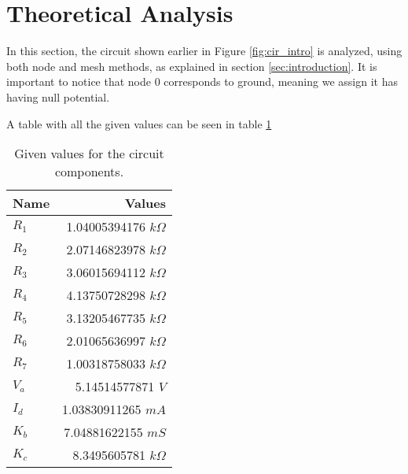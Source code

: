 \section{Theoretical Analysis}
\label{sec:analysis}

In this section, the circuit shown earlier in Figure \ref{fig:cir_intro} is analyzed, using both node and mesh methods, as explained in section \ref{sec:introduction}. It is important to notice that node 0 corresponds to ground, meaning we assign it has having null potential.
\par
A table with all the given values can be seen in table \ref{tab:values}

\begin{table}[H]
  \centering
\begin{tabular}{|l|r|}
\hline
{\bf Name} & {\bf Values}         \\ \hline
$R_1$ & 1.04005394176 $k\Omega$ \\ \hline
$R_2$ & 2.07146823978 $k\Omega$ \\ \hline
$R_3$ & 3.06015694112 $k\Omega$ \\ \hline
$R_4$ & 4.13750728298 $k\Omega$ \\ \hline
$R_5$ & 3.13205467735 $k\Omega$ \\ \hline
$R_6$ & 2.01065636997 $k\Omega$ \\ \hline
$R_7$ & 1.00318758033 $k\Omega$ \\ \hline
$V_a$ & 5.14514577871 $V$ \\ \hline
$I_d$ & 1.03830911265 $mA$ \\ \hline
$K_b$ & 7.04881622155 $mS$ \\ \hline
$K_c$ & 8.3495605781 $k\Omega$ \\ \hline
\end{tabular}
\caption{Given values for the circuit components.}
\label{tab:values}
\end{table}

